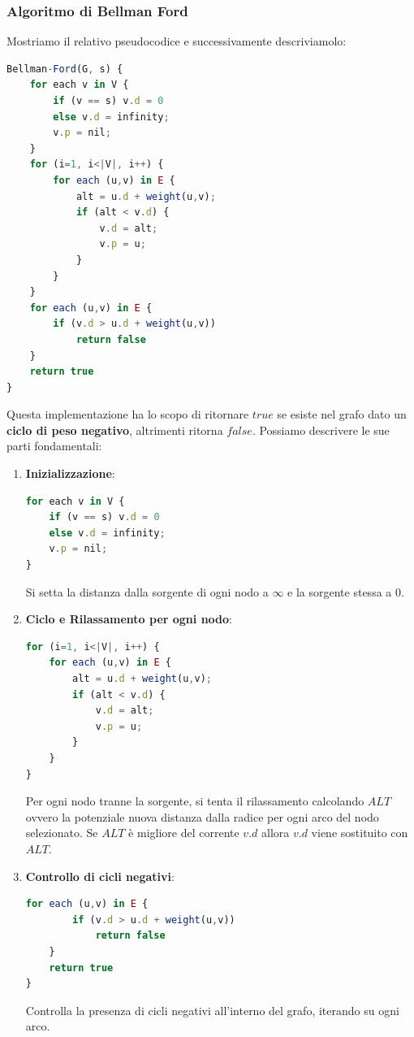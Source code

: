 \documentclass{article}
\begin{document}
\newpage

\subsubsection{Algoritmo di Bellman Ford}

Mostriamo il relativo pseudocodice e successivamente descriviamolo:
\begin{lstlisting}[language=JavaScript]
Bellman-Ford(G, s) {
    for each v in V {
        if (v == s) v.d = 0
        else v.d = infinity;
        v.p = nil;
    }
    for (i=1, i<|V|, i++) {
        for each (u,v) in E {
            alt = u.d + weight(u,v);
            if (alt < v.d) {
                v.d = alt;
                v.p = u;
            }
        }
    }
    for each (u,v) in E {
        if (v.d > u.d + weight(u,v)) 
            return false
    }
    return true
}
\end{lstlisting}

Questa implementazione ha lo scopo di ritornare $true$ se esiste nel grafo dato un \textbf{ciclo di peso negativo}, altrimenti ritorna $false$. Possiamo descrivere le sue parti fondamentali:

\vskip 2.5cm

\begin{enumerate}
    \item \textbf{Inizializzazione}: 
    \begin{lstlisting}[language=JavaScript]
for each v in V {
    if (v == s) v.d = 0
    else v.d = infinity;
    v.p = nil;
}
\end{lstlisting}
Si setta la distanza dalla sorgente di ogni nodo a $\infty$ e la sorgente stessa a 0.



\newpage
\vskip 2.5cm

\item \textbf{Ciclo e Rilassamento per ogni nodo}: 
    \begin{lstlisting}[language=JavaScript]
for (i=1, i<|V|, i++) {
    for each (u,v) in E {
        alt = u.d + weight(u,v);
        if (alt < v.d) {
            v.d = alt;
            v.p = u;
        }
    }
}
\end{lstlisting}
Per ogni nodo tranne la sorgente, si tenta il rilassamento calcolando $ALT$ ovvero la potenziale nuova distanza dalla radice per ogni arco del nodo selezionato. Se $ALT$ è migliore del corrente $v.d$ allora $v.d$ viene sostituito con $ALT$.
\vskip 2.5cm

\item \textbf{Controllo di cicli negativi}: 
\begin{lstlisting}[language=JavaScript]
for each (u,v) in E {
        if (v.d > u.d + weight(u,v)) 
            return false
    }
    return true
}
\end{lstlisting}
Controlla la presenza di cicli negativi all'interno del grafo, iterando su ogni arco.
\end{enumerate}
\end{document}
